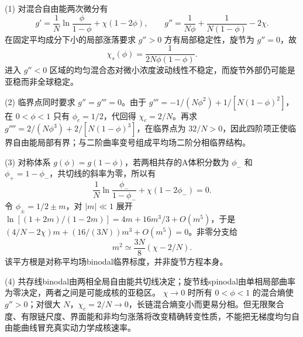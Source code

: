 (1) 对混合自由能两次微分有
\[
g'=\frac1N\ln\frac{\phi}{1-\phi}+\chi(1-2\phi),\qquad
g''=\frac1{N\phi}+\frac1{N(1-\phi)}-2\chi.
\]
在固定平均成分下小的局部涨落要求 \(g''>0\) 方有局部稳定性，旋节为 \(g''=0\)，故
\[
\boxed{\chi_s(\phi)=\frac1{2N\phi(1-\phi)}}.
\]
进入 \(g''<0\) 区域的均匀混合态对微小浓度波动线性不稳定，而旋节外部仍可能是亚稳而非全球稳定。

(2) 临界点同时要求 \(g''=g'''=0\)。由于
\(g'''=-1/(N\phi^2)+1/[N(1-\phi)^2]\)，在 \(0<\phi<1\) 只有 \(\phi_c=1/2\)，代回得 \(\boxed{\chi_c=2/N}\)。再求 \(g''''=2/(N\phi^3)+2/[N(1-\phi)^3]\)，在临界点为 \(32/N>0\)，因此四阶项正使临界自由能局部有界；与二阶曲率变号组成平均场二阶分相临界结构。

(3) 对称体系 \(g(\phi)=g(1-\phi)\)，若两相共存的A体积分数为 \(\phi_-\) 和 \(\phi_+=1-\phi_-\)，共切线的斜率为零，所以有
\[
\boxed{\frac1N\ln\frac{\phi_-}{1-\phi_-}+\chi(1-2\phi_-)=0}.
\]
令 \(\phi_\pm=1/2\pm m\)，对 \(|m|\ll1\) 展开
\(\ln[(1+2m)/(1-2m)]=4m+16m^3/3+O(m^5)\)，于是
\((4/N-2\chi)m+(16/(3N))m^3+O(m^5)=0\)。非零分支给
\[
\boxed{m^2\simeq\frac{3N}{8}(\chi-2/N)}.
\]
该平方根是对称平均场binodal临界标度，并非旋节方程本身。

(4) 共存线binodal由两相全局自由能共切线决定；旋节线spinodal由单相局部曲率为零决定，两者之间是可能成核的亚稳区。 \(\chi\to0\) 时所有 \(0<\phi<1\) 的混合熵使 \(g''>0\)；对很大 \(N\)，\(\chi_c=2/N\to0\)，长链混合熵变小而更易分相。但无限聚合度、有限链尺度、界面能和非均匀涨落将改变精确转变性质，不能把无梯度均匀自由能曲线冒充真实动力学成核速率。
